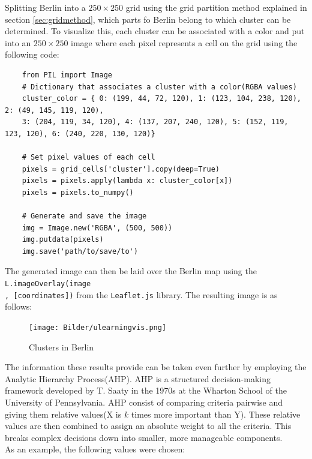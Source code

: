 Splitting Berlin into a $250 \times 250$ grid using the grid partition method explained in section \ref{sec:gridmethod}, which parts fo Berlin belong to which cluster can be determined. To visualize this, each cluster can be associated with a color and put into an $250 \times 250$ image where each pixel represents a cell on the grid using the following code:
\begin{verbatim}
    from PIL import Image
    # Dictionary that associates a cluster with a color(RGBA values)
    cluster_color = { 0: (199, 44, 72, 120), 1: (123, 104, 238, 120), 2: (49, 145, 119, 120),
    3: (204, 119, 34, 120), 4: (137, 207, 240, 120), 5: (152, 119, 123, 120), 6: (240, 220, 130, 120)}

    # Set pixel values of each cell
    pixels = grid_cells['cluster'].copy(deep=True)
    pixels = pixels.apply(lambda x: cluster_color[x])
    pixels = pixels.to_numpy()

    # Generate and save the image
    img = Image.new('RGBA', (500, 500))
    img.putdata(pixels)
    img.save('path/to/save/to')
\end{verbatim}
The generated image can then be laid over the Berlin map using the \verb|L.imageOverlay(image|\\ \verb|, [coordinates])| from the \verb|Leaflet.js| library. The resulting image is as follows:
\begin{figure}[H]
\begin{center}
\texttt{[image: Bilder/ulearningvis.png]}
\caption{ Clusters in Berlin }
\end{center}
\end{figure}
The information these results provide can be taken even further by employing the Analytic Hierarchy Process(AHP). \gls{AHP} is a structured decision-making framework developed by T. Saaty in the 1970s at the Wharton School of the University of Pennsylvania. AHP consist of comparing criteria pairwise and giving them relative values(X is $k$ times more important than Y). These relative values are then combined to assign an absolute weight to all the criteria\cite{AHP}. This breaks complex decisions down into smaller, more manageable components.\\
As an example, the following values were chosen:

